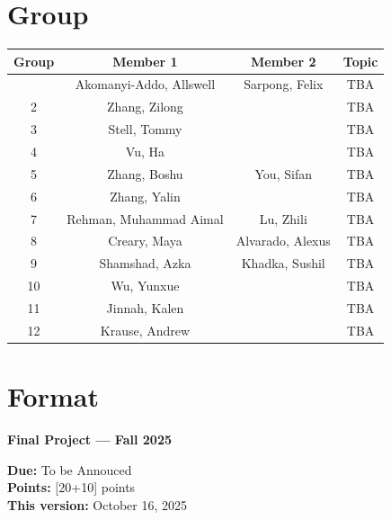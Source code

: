 \documentclass[
  letterpaper,
  DIV=11,
  numbers=noendperiod]{scrreprt}
\begin{document}
\section{Group}\label{group}

\begin{longtable}[]{@{}cccc@{}}
\toprule\noalign{}
Group & Member 1 & Member 2 & Topic \\
\midrule\noalign{}
\endhead
\bottomrule\noalign{}
\endlastfoot
1 & Akomanyi-Addo, Allswell & Sarpong, Felix & TBA \\
2 & Zhang, Zilong & & TBA \\
3 & Stell, Tommy & & TBA \\
4 & Vu, Ha & & TBA \\
5 & Zhang, Boshu & You, Sifan & TBA \\
6 & Zhang, Yalin & & TBA \\
7 & Rehman, Muhammad Aimal & Lu, Zhili & TBA \\
8 & Creary, Maya & Alvarado, Alexus & TBA \\
9 & Shamshad, Azka & Khadka, Sushil & TBA \\
10 & Wu, Yunxue & & TBA \\
11 & Jinnah, Kalen & & TBA \\
12 & Krause, Andrew & & TBA \\
\end{longtable}

\section{Format}\label{format}

\begin{tcolorbox}[enhanced jigsaw, leftrule=.75mm, rightrule=.15mm, toprule=.15mm, opacityback=0, arc=.35mm, bottomrule=.15mm, colframe=quarto-callout-note-color-frame, left=2mm, colback=white, breakable]
\begin{minipage}[t]{5.5mm}
\textcolor{quarto-callout-note-color}{\faInfo}
\end{minipage}%
\begin{minipage}[t]{\textwidth - 5.5mm}

\vspace{-3mm}\textbf{Final Project --- Fall 2025}\vspace{3mm}

\textbf{Due:} To be Annouced\\
\textbf{Points:} {{[}20+10{]} points}\\
\textbf{This version:} October 16, 2025

\end{minipage}%
\end{tcolorbox}
\end{document}
